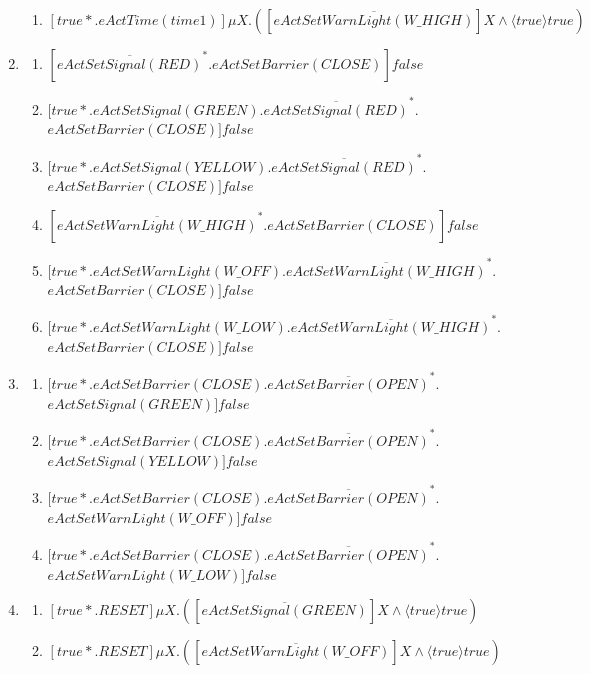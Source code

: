 \documentclass[10pt,a4paper]{article}
\begin{document}
\begin{enumerate}[resume]
\begin{enumerate}
	\item $[true*.eActTime(time1)]\mu X.([\overline{eActSetWarnLight(W\_HIGH)}]X \wedge \langle true\rangle  true)$
	\end{enumerate}
\item
	\begin{enumerate}
    \item $[\overline{eActSetSignal(RED)}^*.eActSetBarrier(CLOSE)]false$
	\item $[true*.eActSetSignal(GREEN).\overline{eActSetSignal(RED)}^*. $\\$ eActSetBarrier(CLOSE)]false$
	\item $[true*.eActSetSignal(YELLOW).\overline{eActSetSignal(RED)}^*. $\\$ eActSetBarrier(CLOSE)]false$
    \item $[\overline{eActSetWarnLight(W\_HIGH)}^*.eActSetBarrier(CLOSE)]false$
	\item $[true*.eActSetWarnLight(W\_OFF).\overline{eActSetWarnLight(W\_HIGH)}^*. $\\$ eActSetBarrier(CLOSE)]false$
	\item $[true*.eActSetWarnLight(W\_LOW).\overline{eActSetWarnLight(W\_HIGH)}^*. $\\$ eActSetBarrier(CLOSE)]false$
    \end{enumerate}
\item
	\begin{enumerate}
    \item $[true*.eActSetBarrier(CLOSE).\overline{eActSetBarrier(OPEN)}^*. $\\$ eActSetSignal(GREEN)]false$
	\item $[true*.eActSetBarrier(CLOSE).\overline{eActSetBarrier(OPEN)}^*. $\\$ eActSetSignal(YELLOW)]false$
    \item $[true*.eActSetBarrier(CLOSE).\overline{eActSetBarrier(OPEN)}^*. $\\$ eActSetWarnLight(W\_OFF)]false$
	\item $[true*.eActSetBarrier(CLOSE).\overline{eActSetBarrier(OPEN)}^*. $\\$ eActSetWarnLight(W\_LOW)]false$
    \end{enumerate}
\item
	\begin{enumerate}
    	\item $[true*.RESET]\mu X.([\overline{eActSetSignal(GREEN)}]X \wedge \langle true\rangle  true)$
		\item  $[true*.RESET]\mu X.([\overline{eActSetWarnLight(W\_OFF)}]X \wedge \langle true\rangle  true)$

\end{enumerate}
\end{enumerate}
\end{document}
